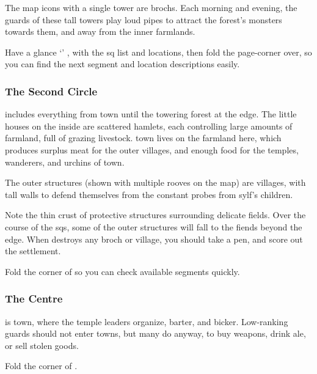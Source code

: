 \begin{multicols}{2}
The map icons with a single tower are \glspl{broch}.
Each morning and evening, the \glspl{guard} of these tall towers play loud pipes to attract the forest's \glspl{monster} towards them, and away from the inner farmlands.

Have a glance `' , with the \gls{sq} list and locations, then fold the page-corner over, so you can find the next \gls{segment} and location descriptions easily.

\subsubsection{The Second Circle}
includes everything from \gls{town} until the towering forest at the \gls{edge}.
The little houses on the inside are scattered hamlets, each controlling large amounts of farmland, full of grazing livestock.
\Gls{town} lives on the farmland here, which produces surplus meat for the outer \glspl{village}, and enough food for the \glspl{temple}, wanderers, and urchins of \gls{town}.

The outer structures (shown with multiple rooves on the map) are \glspl{village}, with tall walls to defend themselves from the constant probes from \gls{sylf}'s children.

Note the thin crust of protective structures surrounding delicate fields.
Over the course of the \glspl{sq}, some of the outer structures will fall to the \glspl{fiend} beyond the \gls{edge}.
When  destroys any \gls{broch} or \gls{village}, you should take a pen, and score out the settlement.

Fold the corner of  so you can check available \glspl{segment} quickly.

\subsubsection{The Centre}
is \gls{town}, where the \gls{temple} leaders organize, barter, and bicker.
Low-ranking \glspl{guard} should not enter towns, but many do anyway, to buy weapons, drink ale, or sell stolen goods.

Fold the corner of .

\end{multicols}
